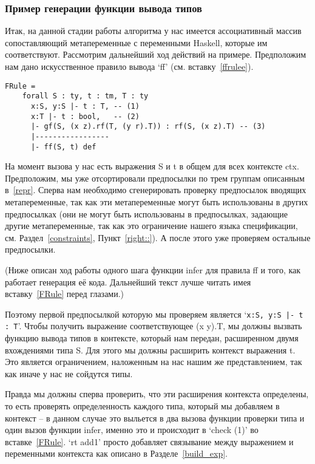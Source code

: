 \subsubsection{Пример генерации функции вывода типов}
Итак, на данной стадии работы алгоритма у нас имеется ассоциативный массив сопоставляющий метапеременные с переменными Haskell, которые им соответствуют. Рассмотрим дальнейший ход действий на примере. Предположим нам дано искусственное правило вывода `ff' (см. вставку~\ref{ffrulee}).

\begin{lstlisting}[label={ffrulee}, caption={Искусственное правило вывода для конструкции `ff'},captionpos=b, frame=single, float, floatplacement=H]
FRule =
    forall S : ty, t : tm, T : ty
      x:S, y:S |- t : T, -- (1)
      x:T |- t : bool,   -- (2)
      |- gf(S, (x z).rf(T, (y r).T)) : rf(S, (x z).T) -- (3)
      |-----------------
      |- ff(S, t) def
\end{lstlisting}

На момент вызова у нас есть выражения S и t в общем для всех контексте ctx. Предположим, мы уже отсортировали предпосылки по трем группам описанным в~\ref{repr}. Сперва нам необходимо сгенерировать проверку предпосылок вводящих метапеременные, так как эти метапеременные могут быть использованы в других предпосылках (они не могут быть использованы в предпосылках, задающие другие метапеременные, так как это ограничение нашего языка спецификации, см. Раздел~\ref{constraints}, Пункт~\ref{right::}). А после этого уже проверяем остальные предпосылки.

(Ниже описан ход работы одного шага функции infer для правила ff и того, как работает генерация её кода. Дальнейший текст лучше читать имея вставку~\ref{FRule} перед глазами.)

Поэтому первой предпосылкой которую мы проверяем является `\lstinline{x:S, y:S |- t : T}'. Чтобы получить выражение соответствующее (x y).T, мы должны вызвать функцию вывода типов в контексте, который нам передан, расширенном двумя вхождениями типа S. Для этого мы должны расширить контекст выражения t. Это является ограничением, наложенным на нас нашим же представлением, так как иначе у нас не сойдутся типы.

Правда мы должны сперва проверить, что эти расширения контекста определены, то есть проверять определенность каждого типа, который мы добавляем в контекст -- в данном случае это выльется в два вызова функции проверки типа и один вызов функции infer, именно это и происходит в `check (1)' во вставке~\ref{FRule}. `rt add1' просто добавляет связывание между выражением и переменными контекста как описано в Разделе~\ref{build_exp}.

